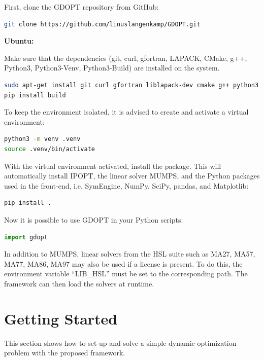 \documentclass[12pt]{article}
\begin{document}
First, clone the GDOPT repository from GitHub:

\begin{lstlisting}[language=bash]
git clone https://github.com/linuslangenkamp/GDOPT.git
\end{lstlisting}

\begin{mdframed}[backgroundcolor=gray!10, roundcorner=10pt,
	linewidth=1pt]

\textbf{Ubuntu:}

Make sure that the dependencies (git, curl, gfortran, LAPACK, CMake, g++, Python3, Python3-Venv, Python3-Build) are installed on the system.

\begin{lstlisting}[language=bash]
sudo apt-get install git curl gfortran liblapack-dev cmake g++ python3 python3-venv
pip install build
\end{lstlisting}

To keep the environment isolated, it is advised to create and activate a virtual environment:

\begin{lstlisting}[language=bash]
python3 -m venv .venv
source .venv/bin/activate
\end{lstlisting}

With the virtual environment activated, install the package. This will automatically install
IPOPT\cite{wachter2006implementation}, the linear solver MUMPS\cite{amestoy2001fully}, and the Python packages used in the front-end, i.e. SymEngine\cite{symengine}, NumPy\cite{harris2020array}, SciPy\cite{virtanen2020scipy}, pandas\cite{mckinney2010data}, and Matplotlib\cite{hunter2007matplotlib}:

\begin{lstlisting}[language=bash]
pip install .
\end{lstlisting}
\end{mdframed}

Now it is possible to use GDOPT in your Python scripts:
\begin{lstlisting}[language=python]
import gdopt
\end{lstlisting}
In addition to MUMPS, linear solvers from the HSL suite such as MA27, MA57, MA77, MA86, MA97\cite{hsl2013collection} may also be used if a license is present. To do this, the environment variable “LIB\_HSL” must be set to the corresponding path. The framework can then load the solvers at runtime.

\section{Getting Started}
This section shows how to set up and solve a simple dynamic
optimization problem with the proposed framework.
\end{document}

